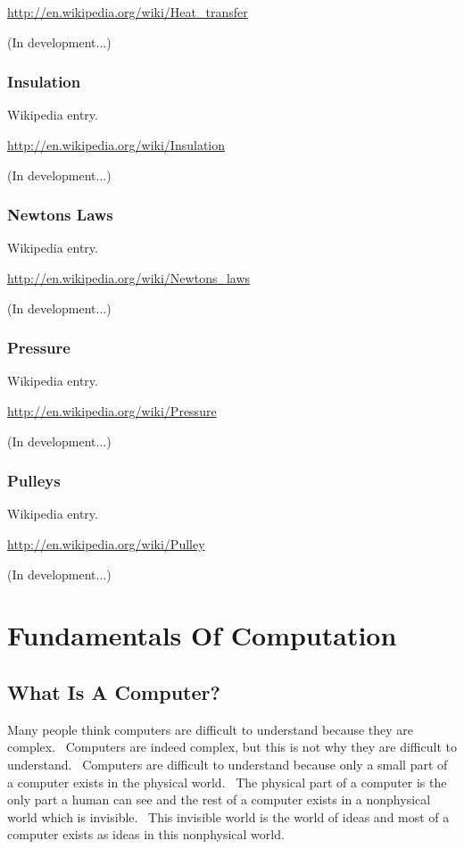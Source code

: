 \documentclass[12pt,twoside]{book}
\begin{document}
\href{http://en.wikipedia.org/wiki/Heat_transfer}{http://en.wikipedia.org/wiki/Heat\_transfer}

(In development...)

\subsection[Insulation]{Insulation}
Wikipedia entry.

\href{http://en.wikipedia.org/wiki/Insulation}{http://en.wikipedia.org/wiki/Insulation}

(In development...)

\subsection[Newton{\textquotesingle}s Laws]{
Newton{\textquotesingle}s Laws}
Wikipedia entry.

\href{http://en.wikipedia.org/wiki/Newtons_laws}{http://en.wikipedia.org/wiki/Newtons\_laws}

(In development...)

\subsection[Pressure]{Pressure}
Wikipedia entry.

\href{http://en.wikipedia.org/wiki/Pressure}{http://en.wikipedia.org/wiki/Pressure}

(In development...)

\subsection[Pulleys]{Pulleys}
Wikipedia entry.

\href{http://en.wikipedia.org/wiki/Pulley}{http://en.wikipedia.org/wiki/Pulley}

(In development...)


\bigskip


\bigskip

\chapter{Fundamentals Of Computation}
\section[What Is A Computer?]{What Is A Computer?}

\bigskip

Many people think computers are difficult to understand because they are
complex. \ Computers are indeed complex, but this is not why they are
difficult to understand. \ Computers are difficult to understand
because only a small part of a computer exists in the physical world.
\ The physical part of a computer is the only part a human can see and
the rest of a computer exists in a nonphysical world which is
invisible. \ This invisible world is the world of ideas and most of a
computer exists as ideas in this nonphysical world.
\end{document}
